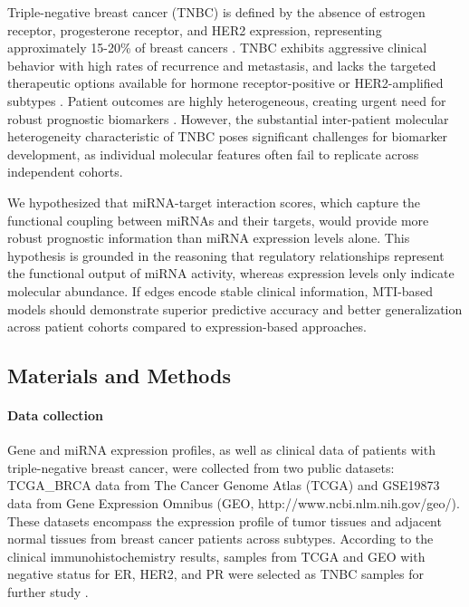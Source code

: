 Triple-negative breast cancer (TNBC) is defined by the absence of estrogen receptor, progesterone receptor, and HER2 expression, representing approximately 15-20\% of breast cancers \cite{zagami2022triple}. TNBC exhibits aggressive clinical behavior with high rates of recurrence and metastasis, and lacks the targeted therapeutic options available for hormone receptor-positive or HER2-amplified subtypes \cite{liao2024inequali}. Patient outcomes are highly heterogeneous, creating urgent need for robust prognostic biomarkers \cite{hsu2022survival}. However, the substantial inter-patient molecular heterogeneity characteristic of TNBC poses significant challenges for biomarker development, as individual molecular features often fail to replicate across independent cohorts.

We hypothesized that miRNA-target interaction scores, which capture the functional coupling between miRNAs and their targets, would provide more robust prognostic information than miRNA expression levels alone. This hypothesis is grounded in the reasoning that regulatory relationships represent the functional output of miRNA activity, whereas expression levels only indicate molecular abundance. If edges encode stable clinical information, MTI-based models should demonstrate superior predictive accuracy and better generalization across patient cohorts compared to expression-based approaches.

\subsection{Materials and Methods}

\paragraph{Data collection}

Gene and miRNA expression profiles, as well as clinical data of patients with triple-negative breast cancer, were collected from two public datasets: TCGA\_BRCA data from The Cancer Genome Atlas (TCGA) \cite{abudour2024role} and GSE19873 data from Gene Expression Omnibus (GEO, http://www.ncbi.nlm.nih.gov/geo/). These datasets encompass the expression profile of tumor tissues and adjacent normal tissues from breast cancer patients across subtypes. According to the clinical immunohistochemistry results, samples from TCGA and GEO with negative status for ER, HER2, and PR were selected as TNBC samples for further study \cite{agarwal2015predicti}.

